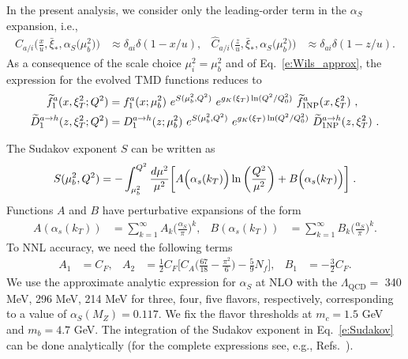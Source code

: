 \documentclass[aps,preprintnumbers,showpacs,nofootinbib,superscriptaddress,floatfix]{revtex4}
\newcommand{\bT}{\xi_T}
\newcommand{\bb}{\xi}
\begin{document}
In the present analysis, we consider only the leading-order term
in the $\alpha_S$ expansion, i.e., 
\begin{align} 
C_{a/i} \Big( \frac{x}{u}, \bar{\bb}_\ast, \alpha_S\big(\mu_b^2\big)  \Big) 
&\approx
\delta_{ai} \delta(1-x/u),
&
\hat{C}_{a/i} \Big( \frac{z}{u}, \bar{\bb}_\ast, \alpha_S\big(\mu_b^2\big) \Big)
 &\approx
\delta_{ai} \delta(1-z/u).
\end{align}  
As a consequence of the scale choice $\mu_i^2=\mu_b^2$ and of
Eq.~\eqref{e:Wils_approx}, 
the expression for the evolved TMD functions reduces to
\begin{align}   
\widetilde{f}_1^a (x,  \bT^2; Q^2) &= f_1^a (x ; \mu_b^2) 
\  e^{S (\mu_b^2, Q^2)} \  e^{g_K(\bT) \ln (Q^2 / Q_0^2)} \  \widetilde{f}_{1 {\rm NP}}^a (x, \bT^2) \ ,
\label{e:TMDevol1b} \\
\widetilde{D}_1^{a\to h} (z, \bT^2; Q^2) &= D_1^{a\to h} (z; \mu_b^2) \  e^{S (\mu_b^2, Q^2)} \  e^{g_K( \bT) \ln (Q^2 / Q_0^2)} \  \widetilde{D}_{1 {\rm NP}}^{a\to h} (z, \bT^2) \  .
\label{e:TMDevol2b}
\end{align}

The Sudakov exponent $S$ 
can be written as
\begin{equation} 
S(\mu_b^2,Q^2)=-\int_{\mu_b^2}^{Q^2}{d\mu^2\over \mu^2}
\bigg[A\Big(\alpha_s(k_T)\Big)\ln\bigg({Q^2\over \mu^2}\bigg) 
+ B\Big(\alpha_s(k_T)\Big) \bigg] \;.
\label{e:Sudakov} 
\end{equation} 
Functions $A$ and $B$ have perturbative expansions of the form
\begin{align}
A\left(\alpha_s(k_T)\right) &= \sum_{k=1}^{\infty}A_k
\bigg(\frac{\alpha_S}{\pi} \bigg)^k,
&
B\left(\alpha_s(k_T)\right) &= \sum_{k=1}^{\infty}B_k
\bigg(\frac{\alpha_S}{\pi} \bigg)^k.
\end{align} 
To NNL accuracy, we need the following 
terms~\cite{Davies:1984hs,Collins:1984kg}
\begin{align}
A_1&= C_F, 
&
A_2&=
\frac{1}{2} C_F  \bigg[
C_A \bigg( \frac{67}{18} - \frac{\pi^2}{6} \bigg)
- \frac{5}{9} N_f \bigg],
&
B_1&= - \frac{3}{2}C_F.
\end{align} 
We use the approximate analytic expression for $\alpha_S$ at NLO with the
$\Lambda_{\text{QCD}}=$ 340 MeV, 296 MeV, 214 MeV for three, four, five
flavors, respectively, corresponding to a value of $\alpha_S(M_Z)=0.117$. 
We fix the flavor thresholds at $m_c=1.5$ GeV and 
$m_b= 4.7$ GeV. The integration of the Sudakov exponent in
Eq.~\eqref{e:Sudakov} can
be done analytically (for the complete expressions see, e.g.,
Refs.~\cite{Frixione:1998dw,Bozzi:2005wk,Echevarria:2012pw}).  
\end{document}
